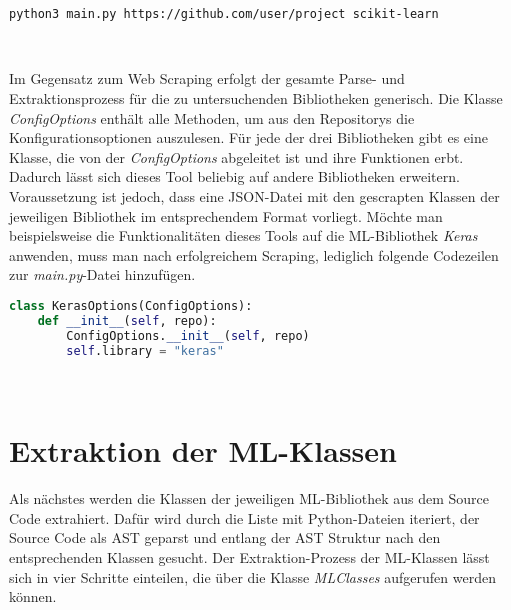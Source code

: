 \documentclass[german,bachelor]{swsLeipzig}
\begin{document}
\noindent\begin{minipage}{\linewidth}
\begin{lstlisting}[language=bash, frame=single, label=execute_coop, basicstyle=\small, caption={Kommandozeilenbefehl für die Extraktion von Konfigurationsoptionen von scikit-learn},captionpos=b]
python3 main.py https://github.com/user/project scikit-learn
\end{lstlisting}
\end{minipage}
\

\noindent Im Gegensatz zum Web Scraping erfolgt der gesamte Parse- und Extraktionsprozess für die zu untersuchenden Bibliotheken generisch.
Die Klasse \textit{ConfigOptions} enthält alle Methoden, um aus den Repositorys die Konfigurationsoptionen auszulesen.
Für jede der drei Bibliotheken gibt es eine Klasse, die von der \textit{ConfigOptions} abgeleitet ist und ihre Funktionen erbt.
Dadurch lässt sich dieses Tool beliebig auf andere Bibliotheken erweitern.
Voraussetzung ist jedoch, dass eine JSON-Datei mit den gescrapten Klassen der jeweiligen Bibliothek im entsprechendem Format vorliegt.
Möchte man beispielsweise die Funktionalitäten dieses Tools auf die ML-Bibliothek \textit{Keras} anwenden, muss man nach erfolgreichem Scraping,
lediglich folgende Codezeilen zur \textit{main.py}-Datei hinzufügen.\\

\noindent\begin{minipage}{\linewidth}
\begin{lstlisting}[language=Python, frame=single, label=keras,  basicstyle=\small, caption={Implementation einer Klasse zur Extraktion von Konfigurationsoptionen einer weiteren ML-Bibliothek},captionpos=b]
class KerasOptions(ConfigOptions):
    def __init__(self, repo):
        ConfigOptions.__init__(self, repo)
        self.library = "keras"
\end{lstlisting}
\end{minipage}
\

\section{Extraktion der ML-Klassen}\label{Classes}
Als nächstes werden die Klassen der jeweiligen ML-Bibliothek aus dem Source Code extrahiert.
Dafür wird durch die Liste mit Python-Dateien iteriert, der Source Code als AST geparst und entlang der AST Struktur
nach den entsprechenden Klassen gesucht.
Der Extraktion-Prozess der ML-Klassen lässt sich in vier Schritte einteilen, die über die Klasse
\textit{MLClasses} aufgerufen werden können.
\end{document}

